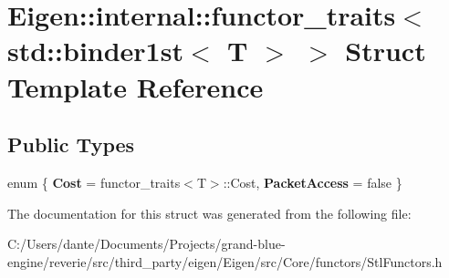 \hypertarget{struct_eigen_1_1internal_1_1functor__traits_3_01std_1_1binder1st_3_01_t_01_4_01_4}{}\section{Eigen\+::internal\+::functor\+\_\+traits$<$ std\+::binder1st$<$ T $>$ $>$ Struct Template Reference}
\label{struct_eigen_1_1internal_1_1functor__traits_3_01std_1_1binder1st_3_01_t_01_4_01_4}
\subsection*{Public Types}
\begin{DoxyCompactItemize}
\item 
\mbox{\label{struct_eigen_1_1internal_1_1functor__traits_3_01std_1_1binder1st_3_01_t_01_4_01_4_ac27a50a1861550d812dcc7d9d23f66d2}} 
enum \{ {\bfseries Cost} = functor\+\_\+traits$<$T$>$\+::Cost, 
{\bfseries Packet\+Access} = false
 \}
\end{DoxyCompactItemize}


The documentation for this struct was generated from the following file\+:\begin{DoxyCompactItemize}
\item 
C\+:/\+Users/dante/\+Documents/\+Projects/grand-\/blue-\/engine/reverie/src/third\+\_\+party/eigen/\+Eigen/src/\+Core/functors/Stl\+Functors.\+h\end{DoxyCompactItemize}
